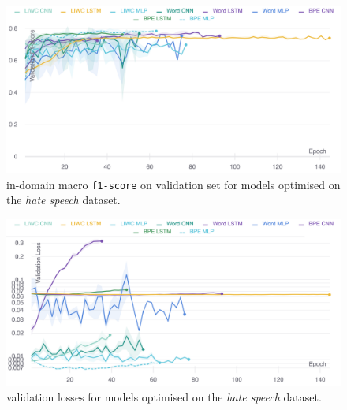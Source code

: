 \begin{figure}
    \centering
    \includegraphics[width=\textwidth]{waseem_hovy_dev_f1.pdf}
    \caption{in-domain macro \texttt{f1-score} on validation set for models optimised on the \textit{hate speech} dataset.}
    \label{fig:waseem_hovy_dev_f1}
\end{figure}
\begin{figure}
    \centering
    \includegraphics[width=\textwidth]{waseem_hovy_dev_loss_stderr_logscale.pdf}
    \caption{validation losses for models optimised on the \textit{hate speech} dataset.}
    \label{fig:waseem_hovy_dev_loss}
\end{figure}


